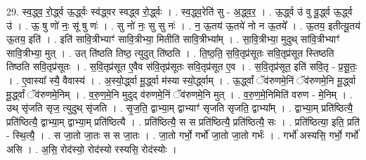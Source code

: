 \documentclass[17pt]{extarticle}
\begin{document}
29. स्व॒द्ध्व॒ रो॒र्द्ध्व ऊ॒र्द्ध्वः स्व॑द्ध्वर स्वद्ध्व रो॒र्द्ध्वः । . स्व॒द्ध्व॒रेति॑ सु - अ॒द्ध्व॒र॒ । . ऊ॒र्द्ध्व उ॑ वु वू॒र्द्ध्व ऊ॒र्द्ध्व उ॑ । . ऊ॒ षु णो॑ नः॒ सू॑ षु णः॑ । . सु नो॑ नः॒ सु सु नः॑ । . न॒ ऊ॒तय॑ ऊ॒तये॑ नो न ऊ॒तये᳚ । . ऊ॒तय॒ इतीत्यू॒तय॑ ऊ॒तय॒ इति॑ । . इति॑ सावि॒त्रीभ्याꣳ॑ सावि॒त्रीभ्या॒ मितीति॑ सावि॒त्रीभ्या᳚म् । . सा॒वि॒त्रीभ्या॒ मुदुथ् सा॑वि॒त्रीभ्याꣳ॑ सावि॒त्रीभ्या॒ मुत् । . उत् ति॑ष्ठति तिष्ठ॒ त्युदुत् ति॑ष्ठति । . ति॒ष्ठ॒ति॒ स॒वि॒तृप्र॑सूतः सवि॒तृप्र॑सूत स्तिष्ठति तिष्ठति सवि॒तृप्र॑सूतः । . स॒वि॒तृप्र॑सूत ए॒वैव स॑वि॒तृप्र॑सूतः सवि॒तृप्र॑सूत ए॒व । . स॒वि॒तृप्र॑सूत॒ इति॑ सवि॒तृ - प्र॒सू॒तः॒ । . ए॒वास्या᳚ स्यै॒ वैवास्य॑ । . अ॒स्यो॒र्द्ध्वा मू॒र्द्ध्वा म॑स्या स्यो॒र्द्ध्वाम् । . ऊ॒र्द्ध्वां ॅव॑रुणमे॒निं ॅव॑रुणमे॒नि मू॒र्द्ध्वा मू॒र्द्ध्वां ॅव॑रुणमे॒निम् । . व॒रु॒ण॒मे॒नि मुदुद् व॑रुणमे॒निं ॅव॑रुणमे॒नि मुत् । . व॒रु॒ण॒मे॒निमिति॑ वरुण - मे॒निम् । . उथ् सृ॑जति सृज॒ त्युदुथ् सृ॑जति । . सृ॒ज॒ति॒ द्वाभ्या॒म् द्वाभ्याꣳ॑ सृजति सृजति॒ द्वाभ्या᳚म् । . द्वाभ्या॒म् प्रति॑ष्ठित्यै॒ प्रति॑ष्ठित्यै॒ द्वाभ्या॒म् द्वाभ्या॒म् प्रति॑ष्ठित्यै । . प्रति॑ष्ठित्यै॒ स स प्रति॑ष्ठित्यै॒ प्रति॑ष्ठित्यै॒ सः । . प्रति॑ष्ठित्या॒ इति॒ प्रति॑ - स्थि॒त्यै॒ । . स जा॒तो जा॒तः स स जा॒तः । . जा॒तो गर्भो॒ गर्भो॑ जा॒तो जा॒तो गर्भः॑ । . गर्भो॑ अस्यसि॒ गर्भो॒ गर्भो॑ असि । . अ॒सि॒ रोद॑स्यो॒ रोद॑स्यो रस्यसि॒ रोद॑स्योः । \newline
\end{document}
